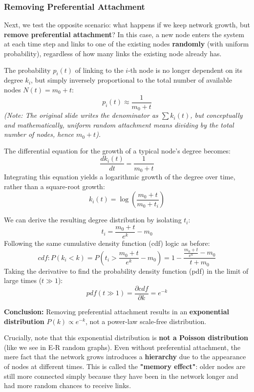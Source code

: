 \subsubsection{Removing Preferential Attachment}
Next, we test the opposite scenario: what happens if we keep network growth, but \textbf{remove preferential attachment}?
In this case, a new node enters the system at each time step and links to one of the existing nodes \textbf{randomly} (with uniform probability), regardless of how many links the existing node already has.

The probability \( p_i(t) \) of linking to the \( i \)-th node is no longer dependent on its degree \( k_i \), but simply inversely proportional to the total number of available nodes \( N(t) = m_0 + t \):
\[
    p_i(t) \approx \frac{1}{m_0 + t}
\]
\textit{(Note: The original slide writes the denominator as \( \sum k_i(t) \), but conceptually and mathematically, uniform random attachment means dividing by the total number of nodes, hence \( m_0 + t \)).}

The differential equation for the growth of a typical node's degree becomes:
\[
    \frac{dk_i(t)}{dt} = \frac{1}{m_0 + t}
\]
Integrating this equation yields a logarithmic growth of the degree over time, rather than a square-root growth:
\[
    k_i(t) = \log\left(\frac{m_0 + t}{m_0 + t_i}\right)
\]

We can derive the resulting degree distribution by isolating \( t_i \):
\[
    t_i = \frac{m_0 + t}{e^k} - m_0
\]
Following the same cumulative density function (cdf) logic as before:
\[
    cdf : P(k_i < k) = P\left( t_i > \frac{m_0 + t}{e^k} - m_0 \right) = 1 - \frac{\frac{m_0 + t}{e^k} - m_0}{t + m_0}
\]
Taking the derivative to find the probability density function (pdf) in the limit of large times (\( t \gg 1 \)):
\[
    pdf(t \gg 1) = \frac{\partial cdf}{\partial k} = e^{-k}
\]

\textbf{Conclusion:} Removing preferential attachment results in an \textbf{exponential distribution} \( P(k) \propto e^{-k} \), not a power-law scale-free distribution.

Crucially, note that this exponential distribution is \textbf{not a Poisson distribution} (like we see in E-R random graphs). Even without preferential attachment, the mere fact that the network grows introduces a \textbf{hierarchy} due to the appearance of nodes at different times. This is called the \textbf{"memory effect"}: older nodes are still more connected simply because they have been in the network longer and had more random chances to receive links.

